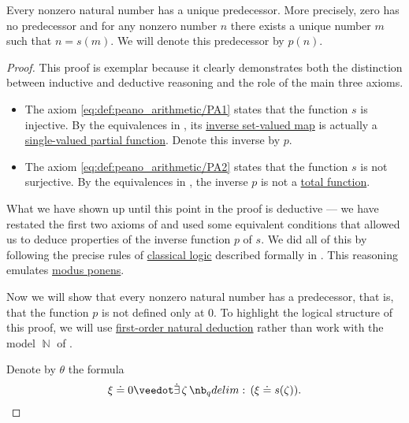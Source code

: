 \begin{proposition}\label{thm:nonzero_natural_numbers_have_predecessors}
  Every nonzero natural number has a unique predecessor. More precisely, zero has no predecessor and for any nonzero number \( n \) there exists a unique number \( m \) such that \( n = s(m) \). We will denote this predecessor by \( p(n) \).
\end{proposition}
\begin{proof}
  This proof is exemplar because it clearly demonstrates both the distinction between inductive and deductive reasoning and the role of the main three axioms.

  \begin{itemize}
    \item The axiom \eqref{eq:def:peano_arithmetic/PA1} states that the function \( s \) is injective. By the equivalences in , its \hyperref[def:set_valued_map/inverse]{inverse set-valued map} is actually a \hyperref[def:set_valued_map/partial]{single-valued partial function}. Denote this inverse by \( p \).

    \item The axiom \eqref{eq:def:peano_arithmetic/PA2} states that the function \( s \) is not surjective. By the equivalences in , the inverse \( p \) is not a \hyperref[def:set_valued_map/partial]{total function}.
  \end{itemize}

  What we have shown up until this point in the proof is deductive --- we have restated the first two axioms of  and used some equivalent conditions that allowed us to deduce properties of the inverse function \( p \) of \( s \). We did all of this by following the precise rules of \hyperref[rem:classical_logic]{classical logic} described formally in . This reasoning emulates \hyperref[eq:def:def:axiomatic_deductive_system/mp]{modus ponens}.

  Now we will show that every nonzero natural number has a predecessor, that is, that the function \( p \) is not defined only at \( 0 \). To highlight the logical structure of this proof, we will use \hyperref[def:first_order_natural_deduction_system]{first-order natural deduction} rather than work with the model \( \BbbN \) of .

  Denote by \( \theta \) the formula
  \begin{equation*}
    \xi \syneq 0 \synvee \qexists \zeta (\xi \syneq s(\zeta)).
  \end{equation*}


\end{proof}
